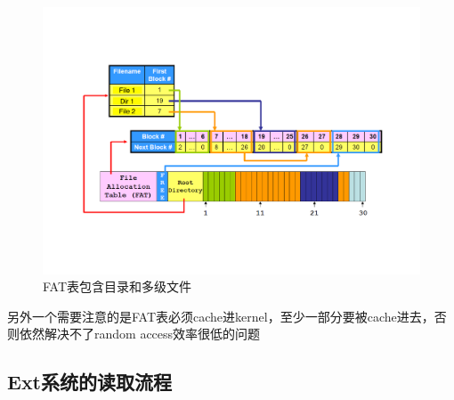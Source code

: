 \documentclass[]{report}
\begin{document}
\begin{figure}[h]
\begin{minipage}{20em}
\begin{minipage}{20em}
				\end{minipage}
				\begin{minipage}{20em}
					\centering
					\includegraphics[scale = 0.23]{images/FAT_Explain_2.pdf}
					\caption{FAT表包含目录和多级文件}
				\end{minipage}
			\end{minipage}
		\end{figure}
		另外一个需要注意的是FAT表必须cache进kernel，至少一部分要被cache进去，否则依然解决不了random access效率很低的问题
		\subsection{Ext系统的读取流程}
\end{document}
